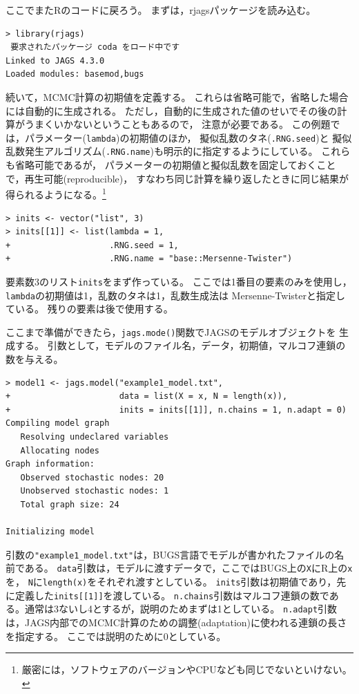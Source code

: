 \documentclass[11pt,uplatex]{jsarticle}
\begin{document}
\vspace{1zw}

ここでまた\textsf{R}のコードに戻ろう。
まずは，\textsf{rjags}パッケージを読み込む。
\begin{lstlisting}
> library(rjags)
 要求されたパッケージ coda をロード中です 
Linked to JAGS 4.3.0
Loaded modules: basemod,bugs
\end{lstlisting}

続いて，MCMC計算の初期値を定義する。
これらは省略可能で，省略した場合には自動的に生成される。
ただし，自動的に生成された値のせいでその後の計算がうまくいかないということもあるので，
注意が必要である。
この例題では，パラメーター(\texttt{lambda})の初期値のほか，
擬似乱数のタネ(\texttt{.RNG.seed})と
擬似乱数発生アルゴリズム(\texttt{.RNG.name})も明示的に指定するようにしている。
これらも省略可能であるが，
パラメーターの初期値と擬似乱数を固定しておくことで，再生可能(reproducible)，
すなわち同じ計算を繰り返したときに同じ結果が得られるようになる。\footnote{厳密には，ソフトウェアのバージョンやCPUなども同じでないといけない。}
%
\begin{lstlisting}
> inits <- vector("list", 3)
> inits[[1]] <- list(lambda = 1,
+                    .RNG.seed = 1,
+                    .RNG.name = "base::Mersenne-Twister")
\end{lstlisting}
%
要素数3のリスト\texttt{inits}をまず作っている。
ここでは1番目の要素のみを使用し，
\texttt{lambda}の初期値は1，乱数のタネは1，乱数生成法は Mersenne-Twisterと指定している。
残りの要素は後で使用する。

ここまで準備ができたら，\texttt{jags.mode()}関数でJAGSのモデルオブジェクトを
生成する。
引数として，モデルのファイル名，データ，初期値，マルコフ連鎖の数を与える。
\begin{lstlisting}
> model1 <- jags.model("example1_model.txt",
+                      data = list(X = x, N = length(x)),
+                      inits = inits[[1]], n.chains = 1, n.adapt = 0)
Compiling model graph
   Resolving undeclared variables
   Allocating nodes
Graph information:
   Observed stochastic nodes: 20
   Unobserved stochastic nodes: 1
   Total graph size: 24

Initializing model

\end{lstlisting}
%
引数の\texttt{"example1\_model.txt"}は，BUGS言語でモデルが書かれたファイルの名前である。
\texttt{data}引数は，モデルに渡すデータで，ここではBUGS上の\texttt{X}に\textsf{R}上の\texttt{x}を，
\texttt{N}に\texttt{length(x)}をそれぞれ渡すとしている。
\texttt{inits}引数は初期値であり，先に定義した\texttt{inits[[1]]}を渡している。
\texttt{n.chains}引数はマルコフ連鎖の数である。通常は3ないし4とするが，説明のためまずは1としている。
\texttt{n.adapt}引数は，\textsf{JAGS}内部でのMCMC計算のための調整(adaptation)に使われる連鎖の長さを指定する。
ここでは説明のために0としている。
\end{document}
